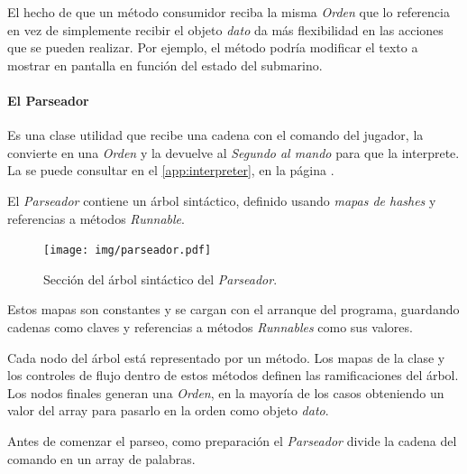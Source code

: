 \documentclass[a4paper,
	11pt,
	parskip=full,
	bibliography=totoc,
	twoside
	]{scrartcl}
\begin{document}
			El hecho de que un método consumidor reciba la misma \textit{Orden} que lo referencia en vez de simplemente recibir el objeto \textit{dato} da más flexibilidad en las acciones que se pueden realizar. Por ejemplo, el método podría modificar el texto a mostrar en pantalla en función del estado del submarino.
			
		\paragraph{El Parseador}
			Es una clase utilidad que recibe una cadena con el comando del jugador, la convierte en una \textit{Orden} y la devuelve al \textit{Segundo al mando} para que la interprete. La  se puede consultar en el \autoref{app:interpreter}, en la página \pageref{app:interpreter}.
			
			El \textit{Parseador} contiene un árbol sintáctico, definido usando \textit{mapas de hashes} y referencias a métodos \textit{Runnable}\footnotemark. \begin{figure}[p]
				\centering
				\texttt{[image: img/parseador.pdf]}
				\caption{Sección del árbol sintáctico del \textit{Parseador}.}
				\label{fig:parseador}
			\end{figure}Estos mapas son constantes y se cargan con el arranque del programa, guardando cadenas como claves y referencias a métodos \textit{Runnables} como sus valores.
			
			Cada nodo del árbol está representado por un método. Los mapas de la clase y los controles de flujo dentro de estos métodos definen las ramificaciones del árbol. Los nodos finales generan una \textit{Orden}, en la mayoría de los casos obteniendo un valor del array para pasarlo en la orden como objeto \textit{dato}.
			
			Antes de comenzar el parseo, como preparación el \textit{Parseador} divide la cadena del comando en un array de palabras.
			
\end{document}
